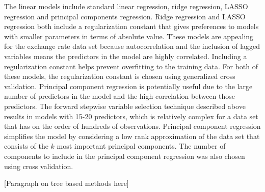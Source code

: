 \documentclass{sig-alternate-05-2015}
\begin{document}
\par{} The linear models include standard linear regression, ridge regression, LASSO regression and principal components regression. Ridge regression and LASSO regression both include a regularization constant that gives preferences to models with smaller parameters in terms of absolute value. These models are appealing for the exchange rate data set because autocorrelation and the inclusion of lagged variables means the predictors in the model are highly correlated. Including a regularization constant helps prevent overfitting to the training data. For both of these models, the regularization constant is chosen using generalized cross validation. Principal component regression is potentially useful due to the large number of predictors in the model and the high correlation between those predictors. The forward stepwise variable selection technique described above results in models with 15-20 predictors, which is relatively complex for a data set that has on the order of hundreds of observations. Principal component regression simplifies the model by considering a low rank approximation of the data set that consists of the $k$ most important principal components. The number of components to include in the principal component regression was also chosen using cross validation. 

\par{} [Paragraph on tree based methods here]
\end{document}
